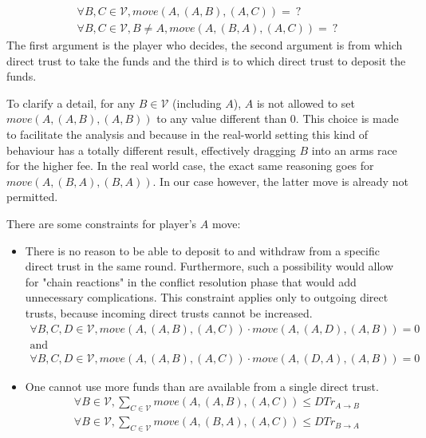   \begin{gather*}
    \forall B, C \in \mathcal{V}, move\left(A, \left(A, B\right), \left(A, C\right) \right) = \: ? \\
    \forall B, C \in \mathcal{V}, B \neq A, move\left(A, \left(B, A\right), \left(A, C\right) \right) = \: ?
  \end{gather*}
  The first argument is the player who decides, the second argument is from which direct trust to take the funds and the third
  is to which direct trust to deposit the funds.
  
  To clarify a detail, for any $B \in \mathcal{V}$ (including $A$), $A$ is not allowed to set $move\left(A, \left(A, B\right),
  \left(A, B\right) \right)$ to any value different than 0. This choice is made to facilitate the analysis and because in the
  real-world setting this kind of behaviour has a totally different result, effectively dragging $B$ into an arms race for the
  higher fee. In the real world case, the exact same reasoning goes for $move\left(A, \left(B, A\right), \left(B, A\right)
  \right)$. In our case however, the latter move is already not permitted.
  
  There are some constraints for player's $A$ move:
  \begin{itemize}
    \item There is no reason to be able to deposit to and withdraw from a specific direct trust in the same round.
    Furthermore, such a possibility would allow for "chain reactions" in the conflict resolution phase that would add
    unnecessary complications.  This constraint applies only to outgoing direct trusts, because incoming direct trusts cannot
    be increased.
    \begin{gather*}
      \forall B, C, D \in \mathcal{V}, move\left(A, \left(A, B\right), \left(A, C\right) \right) \cdot move\left(A, \left(A,
      D\right), \left(A, B\right) \right) = 0 \\
      \mbox{and} \\
      \forall B, C, D \in \mathcal{V}, move\left(A, \left(A, B\right), \left(A, C\right) \right) \cdot move\left(A, \left(D,
      A\right), \left(A, B\right) \right) = 0
    \end{gather*}
  
    \item One cannot use more funds than are available from a single direct trust.
    \begin{gather*}
      \forall B \in \mathcal{V}, \sum\limits_{C \in \mathcal{V}} move\left(A, \left(A, B\right), \left(A, C\right) \right)
        \leq DTr_{A \rightarrow B} \\
      \forall B \in \mathcal{V}, \sum\limits_{C \in \mathcal{V}} move\left(A, \left(B, A\right), \left(A, C\right) \right)
        \leq DTr_{B \rightarrow A} \\
    \end{gather*}
  \end{itemize}
  
